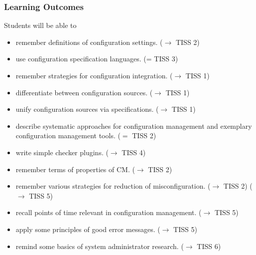 \begin{frame}
	\tiny
	\frametitle{Learning Outcomes}
	Students will be able to

	\begin{itemize}
	\item remember definitions of configuration settings.
	($\rightarrow$ TISS 2)

	\item use configuration specification languages.
	(= TISS 3)

	\item remember strategies for configuration integration.
	($\rightarrow$ TISS 1)

	\item differentiate between configuration sources.
	($\rightarrow$ TISS 1)
	\item unify configuration sources via specifications.
	($\rightarrow$ TISS 1)

	\item describe systematic approaches for configuration management and exemplary configuration management tools.
	($=$ TISS 2)

	\item write simple checker plugins.
	($\rightarrow$ TISS 4)

	\item remember terms of properties of CM.
	($\rightarrow$ TISS 2)
	\item remember various strategies for reduction of misconfiguration.
	($\rightarrow$ TISS 2)
	($\rightarrow$ TISS 5)

	\item recall points of time relevant in configuration management.
	($\rightarrow$ TISS 5)

	\item apply some principles of good error messages.
	($\rightarrow$ TISS 5)
	\item remind some basics of system administrator research.
	($\rightarrow$ TISS 6)


\end{itemize}
\end{frame}
